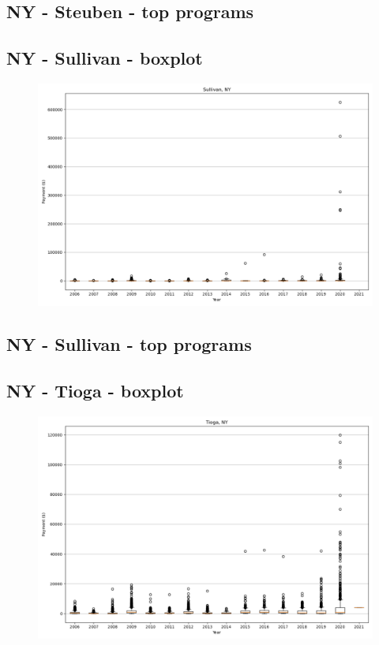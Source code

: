 \subsection*{NY - Steuben - top programs}

\newpage
\subsection*{NY - Sullivan - boxplot}
\begin{figure}[h]
\centering
\includegraphics[width=7in]{../output/boxplots/counties/Sullivan-NY_boxplot.png}
\end{figure}


\subsection*{NY - Sullivan - top programs}

\newpage
\subsection*{NY - Tioga - boxplot}
\begin{figure}[h]
\centering
\includegraphics[width=7in]{../output/boxplots/counties/Tioga-NY_boxplot.png}
\end{figure}


